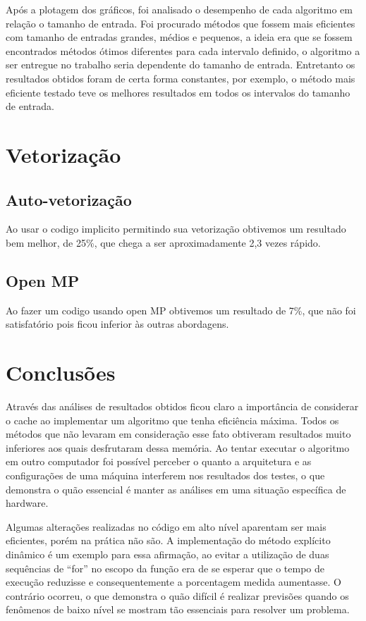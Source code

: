 \documentclass[a4paper, 10pt]{article}
\begin{document}
Após a plotagem dos gráficos, foi analisado o desempenho de cada algoritmo em relação o tamanho de entrada. Foi procurado métodos que fossem mais eficientes com tamanho de entradas grandes, médios e pequenos, a ideia era que se fossem encontrados métodos ótimos diferentes para cada intervalo definido, o algoritmo a ser entregue no trabalho seria dependente do tamanho de entrada. Entretanto os resultados obtidos foram de certa forma constantes, por exemplo, o método mais eficiente testado teve os melhores resultados em todos os intervalos do tamanho de entrada.

\newpage
\section{Vetorização}
\subsection{Auto-vetorização}
Ao usar o codigo implicito permitindo sua vetorização obtivemos um resultado bem melhor, de 25\%, que chega a ser aproximadamente 2,3 vezes rápido.
\subsection{Open MP}
Ao fazer um codigo usando open MP obtivemos um resultado de 7\%, que não foi satisfatório pois ficou inferior às outras abordagens.

\section{Conclusões}
Através das análises de resultados obtidos ficou claro a importância de considerar o cache ao implementar um algoritmo que tenha eficiência máxima. Todos os métodos que não levaram em consideração esse fato obtiveram resultados muito inferiores aos quais desfrutaram dessa memória. Ao tentar executar o algoritmo em outro computador foi possível perceber o quanto a arquitetura e as configurações de uma máquina interferem nos resultados dos testes, o que demonstra o quão essencial é manter as análises em uma situação específica de hardware.

Algumas alterações realizadas no código em alto nível aparentam ser mais eficientes, porém na prática não são. A implementação do método explícito dinâmico é um exemplo para essa afirmação, ao evitar a utilização de duas sequências de “for” no escopo da função era de se esperar que o tempo de execução reduzisse e consequentemente a porcentagem medida aumentasse. O contrário ocorreu, o que demonstra o quão difícil é realizar previsões quando os fenômenos de baixo nível se mostram tão essenciais para resolver um problema.
\end{document}
